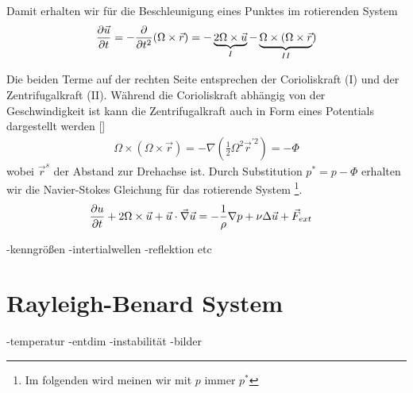 \iffalse
\begin{align}
    \left\pdn{t} \right|_{Inertial} &= \left\pdn[]{\vec{t}}\right|_{Rotated} + \Omega \times
\end{align}
\fi
Damit erhalten wir für die Beschleunigung eines Punktes im rotierenden System
\begin{align}
    \pdn[\vec{u}]{t} = -\pdn[]{t^2}(\Omega \times \vec{r}) = -\underbrace{2\Omega \times \vec{u}}_{I} - \underbrace{\Omega \times (\Omega \times \vec{r}}_{II})
\end{align}

Die beiden Terme auf der rechten Seite entsprechen der Corioliskraft (I) und der Zentrifugalkraft (II). Während die Corioliskraft abhängig von der Geschwindigkeit ist
kann die Zentrifugalkraft auch in Form eines Potentials dargestellt werden []
\begin{align}
    \Omega \times (\Omega \times \vec{r}) = - \nabla(\frac{1}{2}\Omega^2\vec{r}^{'2}) = -\Phi
\end{align}
wobei $\vec{r}^s$ der Abstand zur Drehachse ist. Durch Substitution $p^* = p - \Phi$
erhalten wir die Navier-Stokes Gleichung für das rotierende System \footnote{Im folgenden wird meinen wir mit $p$ immer $p^*$ }.
\begin{align}
    \pdn[u]{t} + 2\Omega \times \vec{u} +  \vec{u} \cdot \vec{\nabla} \vec{u} &= - \frac{1}{\rho} \nabla p + \nu \Delta \vec{u} + \vec{F}_{ext}
\end{align}

-kenngrößen
-intertialwellen
-reflektion etc

\section{Rayleigh-Benard System}
-temperatur
-entdim
-instabilität
-bilder





